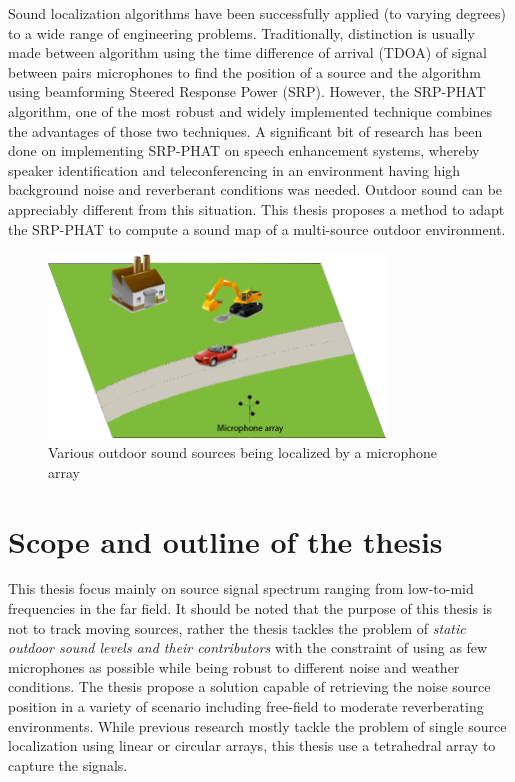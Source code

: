Sound localization algorithms have been successfully applied (to varying degrees) to a wide range of engineering problems. Traditionally, distinction is usually made between algorithm using the time difference of arrival (TDOA)   of signal between pairs microphones to find the position of a source and the algorithm using beamforming Steered Response Power (SRP). However, the SRP-PHAT algorithm, one of the most robust and widely implemented technique combines the advantages of those two techniques. A significant bit of research has been done on implementing SRP-PHAT on speech enhancement systems, whereby speaker identification and teleconferencing in an environment having high background noise and reverberant conditions was needed. Outdoor sound can be appreciably different from this situation. This thesis proposes a method to adapt the SRP-PHAT to compute a sound map of a multi-source outdoor environment.

\begin{figure}[H]
    \centering
    \includegraphics[width=0.8\textwidth]{Figures/scenariofarfield.png}
    \caption{Various outdoor sound sources being localized by a microphone array}
    \label{fig:Introductioncase}
\end{figure}

\section{Scope and outline of the thesis}

This thesis focus mainly on source signal spectrum ranging from low-to-mid frequencies in the far field. It should be noted that the purpose of this thesis is not to track moving sources, rather the thesis tackles the problem of \textit{static outdoor sound levels and their contributors} with the constraint of using as few microphones as possible while being robust to different noise and weather conditions. The thesis propose a solution capable of retrieving the noise source position in a variety of scenario including free-field to moderate reverberating environments. While previous research mostly tackle the problem of single source localization using linear or circular arrays, this thesis use a tetrahedral array to capture the signals.

